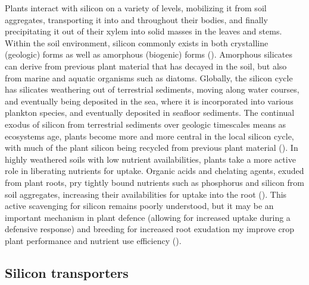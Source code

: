 \documentclass[12pt, letterpaper, ]{article}
\begin{document}
Plants interact with silicon on a variety of levels, mobilizing it from soil aggregates, transporting it into and throughout their bodies, and finally precipitating it out of their xylem into solid masses in the leaves and stems. Within the soil environment, silicon commonly exists in both crystalline (geologic) forms as well as amorphous (biogenic) forms (\cite{haynes_contemporary_2014}). Amorphous silicates can derive from previous plant material that has decayed in the soil, but also from marine and aquatic organisms such as diatoms. Globally, the silicon cycle has silicates weathering out of terrestrial sediments, moving along water courses, and eventually being deposited in the sea, where it is incorporated into various plankton species, and eventually deposited in seafloor sediments. The continual exodus of silicon from terrestrial sediments over geologic timescales means as ecosystems age, plants become more and more central in the local silicon cycle, with much of the plant silicon being recycled from previous plant material (\cite{de_tombeur_plants_2020}). In highly weathered soils with low nutrient availabilities, plants take a more active role in liberating nutrients for uptake. Organic acids and chelating agents, exuded from plant roots, pry tightly bound nutrients such as phosphorus and silicon from soil aggregates, increasing their availabilities for uptake into the root (\cite{de_tombeur_silicon_2021-1}). This active scavenging for silicon remains poorly understood, but it may be an important mechanism in plant defence (allowing for increased uptake during a defensive response) and breeding for increased root exudation my improve crop plant performance and nutrient use efficiency (\cite{de_tombeur_silicon_2021}).

\subsection{Silicon transporters}	
\end{document}
